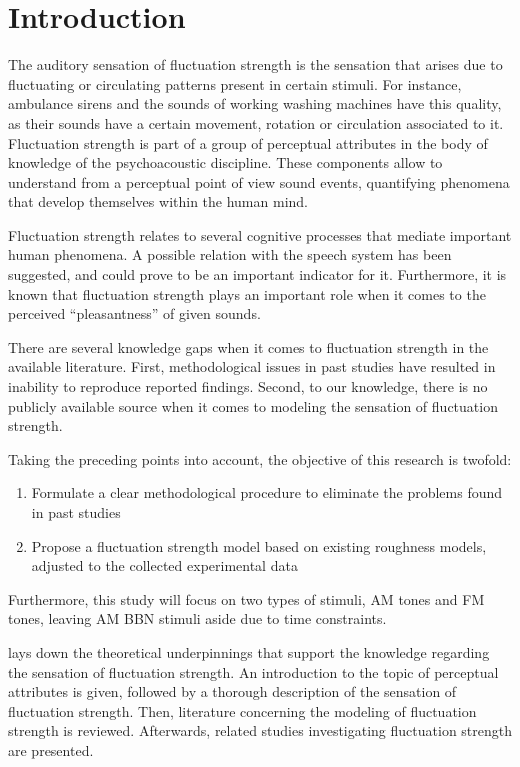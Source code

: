 \documentclass[../main.tex]{subfiles}
\begin{document}
\chapter{Introduction}
\label{cha:introduction}

The auditory sensation of fluctuation strength is the sensation that arises due
to fluctuating or circulating patterns present in certain stimuli. For instance,
ambulance sirens and the sounds of working washing machines have this quality,
as their sounds have a certain movement, rotation or circulation associated to
it. Fluctuation strength is part of a group of perceptual attributes in the body
of knowledge of the psychoacoustic discipline. These components allow to
understand from a perceptual point of view sound events, quantifying phenomena
that develop themselves within the human mind.

Fluctuation strength relates to several cognitive processes that mediate
important human phenomena. A possible relation with the speech system has been
suggested, and could prove to be an important indicator for it. Furthermore, it
is known that fluctuation strength plays an important role when it comes to the
perceived ``pleasantness'' of given sounds.

There are several knowledge gaps when it comes to fluctuation strength in the
available literature. First, methodological issues in past studies have resulted
in inability to reproduce reported findings. Second, to our knowledge, there is
no publicly available source when it comes to modeling the sensation of
fluctuation strength.

Taking the preceding points into account, the objective of this research is
twofold:
\begin{enumerate}
  \item Formulate a clear methodological procedure to eliminate the problems
    found in past studies
  \item Propose a fluctuation strength model based on existing roughness models,
    adjusted to the collected experimental data
\end{enumerate}

Furthermore, this study will focus on two types of stimuli, \gls{AM} tones and
\gls{FM} tones, leaving \gls{AM} \gls{BBN} stimuli aside due to time
constraints.

 lays down the theoretical underpinnings that support the
knowledge regarding the sensation of fluctuation strength. An introduction to
the topic of perceptual attributes is given, followed by a thorough description
of the sensation of fluctuation strength. Then, literature concerning the
modeling of fluctuation strength is reviewed. Afterwards, related studies
investigating fluctuation strength are presented.
\end{document}
